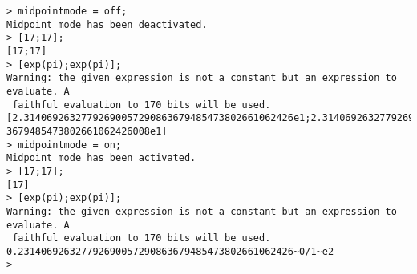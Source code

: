 \begin{center}\begin{minipage}{15cm}\begin{Verbatim}[frame=single]
> midpointmode = off;
Midpoint mode has been deactivated.
> [17;17];
[17;17]
> [exp(pi);exp(pi)];
Warning: the given expression is not a constant but an expression to evaluate. A
 faithful evaluation to 170 bits will be used.
[2.31406926327792690057290863679485473802661062426e1;2.3140692632779269005729086
3679485473802661062426008e1]
> midpointmode = on;
Midpoint mode has been activated.
> [17;17];
[17]
> [exp(pi);exp(pi)];
Warning: the given expression is not a constant but an expression to evaluate. A
 faithful evaluation to 170 bits will be used.
0.231406926327792690057290863679485473802661062426~0/1~e2
> 
\end{Verbatim}
\end{minipage}\end{center}
